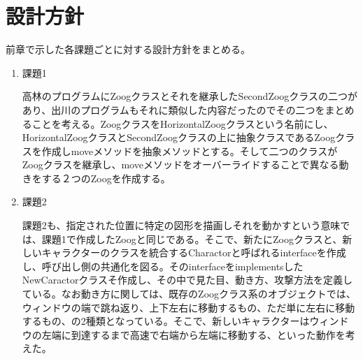 \documentclass[dvipdfmx]{jsarticle}
\begin{document}
\section{設計方針}
前章で示した各課題ごとに対する設計方針をまとめる。
\begin{enumerate}
\item 課題1\par
高林のプログラムにZoogクラスとそれを継承したSecondZoogクラスの二つがあり、出川のプログラムもそれに類似した内容だったのでその二つをまとめることを考える。ZoogクラスをHorizontalZoogクラスという名前にし、HorizontalZoogクラスとSecondZoogクラスの上に抽象クラスであるZoogクラスを作成しmoveメソッドを抽象メソッドとする。そして二つのクラスがZoogクラスを継承し、moveメソッドをオーバーライドすることで異なる動きをする２つのZoogを作成する。
\item 課題2\par
課題2も、指定された位置に特定の図形を描画しそれを動かすという意味では、課題1で作成したZoogと同じである。そこで、新たにZoogクラスと、新しいキャラクターのクラスを統合するCharactorと呼ばれるinterfaceを作成し、呼び出し側の共通化を図る。そのinterfaceをimplementsしたNewCaractorクラスそ作成し、その中で見た目、動き方、攻撃方法を定義している。なお動き方に関しては、既存のZoogクラス系のオブジェクトでは、ウィンドウの端で跳ね返り、上下左右に移動するもの、ただ単に左右に移動するもの、の2種類となっている。そこで、新しいキャラクターはウィンドウの左端に到達するまで高速で右端から左端に移動する、といった動作を考えた。
\end{enumerate}
\end{document}
